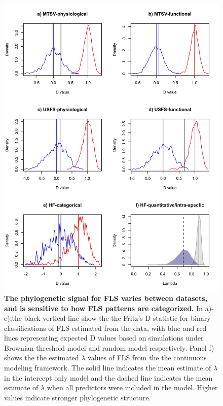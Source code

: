 \documentclass[11pt]{article}
\begin{document}
\begin{figure}[H]
\centering
\includegraphics[height=0.8\textheight]{..//..//phylosig.jpeg} 
  \caption{\textbf{The phylogenetic signal for FLS varies between datasets, and is sensitive to how FLS patterns are categorized.} In a)-e),the black vertical line show the the Fritz's D statistic for binary classifications of FLS estimated from the data, with blue and red lines representing expected D values based on simulations under Brownian threshold model and random model respectively. Panel f) shows the the estimated $\lambda$ values of FLS from the the continuous modeling framework. The solid line indicates the mean estimate of $\lambda$ in the intercept only model and the dashed line indicates the mean estimate of $\lambda$ when all predictors were included in the model. Higher values indicate stronger phylogenetic structure.}
    \label{fig:Dstat}
    \end{figure}

\pagebreak[4]
\end{document}
